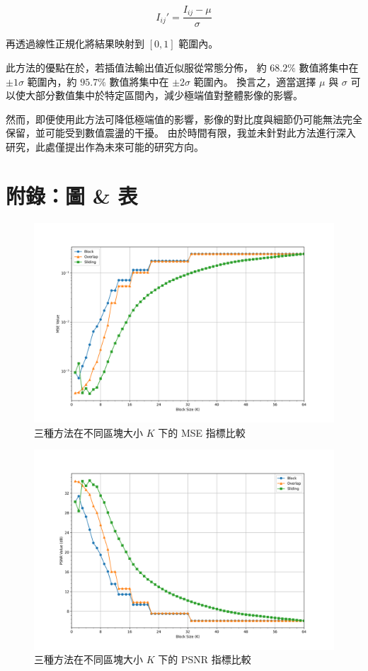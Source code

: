 \documentclass[a4paper,  10pt, oneside, fleqn]{article}
\begin{document}
\begin{equation}
    I_{ij}' = \frac{I_{ij} - \mu}{\sigma}
\end{equation}

再透過線性正規化將結果映射到 $[0, 1]$ 範圍內。

此方法的優點在於，若插值法輸出值近似服從常態分佈，
約 $68.2 \%$ 數值將集中在 $\pm 1\sigma$ 範圍內，約 $95.7 \%$ 數值將集中在 $\pm 2\sigma$ 範圍內。
換言之，適當選擇 $\mu$ 與 $\sigma$ 可以使大部分數值集中於特定區間內，減少極端值對整體影像的影響。

然而，即便使用此方法可降低極端值的影響，影像的對比度與細節仍可能無法完全保留，並可能受到數值震盪的干擾。
由於時間有限，我並未針對此方法進行深入研究，此處僅提出作為未來可能的研究方向。


\newpage

\section*{附錄：圖 \& 表}

\begin{figure}[h]
    \centering
    \includegraphics[width=.75\textwidth]{plots/mse.png}
    \caption{三種方法在不同區塊大小 $K$ 下的 MSE 指標比較}
    \label{fig:plot-mse}
\end{figure}

\begin{figure}[h]
    \centering
    \includegraphics[width=.75\textwidth]{plots/psnr.png}
    \caption{三種方法在不同區塊大小 $K$ 下的 PSNR 指標比較}
    \label{fig:plot-psnr}
\end{figure}
\end{document}
